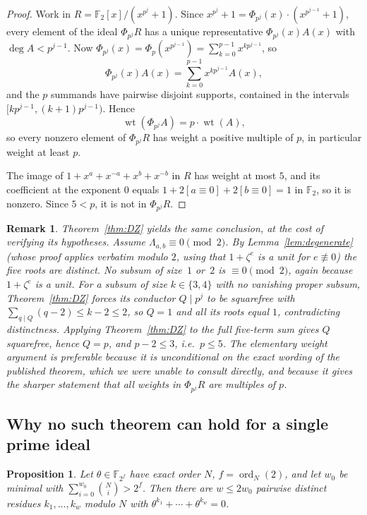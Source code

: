 \documentclass[a4paper]{article}
\newtheorem{proposition}[theorem]{Proposition}
\newtheorem{remark}[theorem]{Remark}
\newcommand{\F}{\mathbb{F}}
\newcommand{\ord}[2][]{\operatorname{ord}_{#1}\!\left(#2\right)}
\newcommand{\wt}{\operatorname{wt}}
\begin{document}
\begin{proof}
	Work in $R=\F_2[x]/(x^{p^j}+1)$.
	Since $x^{p^j}+1=\Phi_{p^j}(x)\cdot(x^{p^{j-1}}+1)$, every element of
	the ideal $\Phi_{p^j}R$ has a unique representative
	$\Phi_{p^j}(x)A(x)$ with $\deg A<p^{j-1}$.
	Now $\Phi_{p^j}(x)=\Phi_p(x^{p^{j-1}})=\sum_{k=0}^{p-1}x^{kp^{j-1}}$, so
	\[
		\Phi_{p^j}(x)A(x)=\sum_{k=0}^{p-1}x^{kp^{j-1}}A(x),
	\]
	and the $p$ summands have pairwise disjoint supports, contained in the
	intervals $[kp^{j-1},(k+1)p^{j-1})$.
	Hence
	\[
		\wt\!\left(\Phi_{p^j}A\right)=p\cdot\wt(A),
	\]
	so every nonzero element of $\Phi_{p^j}R$ has weight a positive
	multiple of $p$, in particular weight at least $p$.

	The image of $1+x^{a}+x^{-a}+x^{b}+x^{-b}$ in $R$ has weight at most
	$5$, and its coefficient at the exponent $0$ equals
	$1+2[a\equiv0]+2[b\equiv0]=1$ in $\F_2$, so it is nonzero.
	Since $5<p$, it is not in $\Phi_{p^j}R$.
\end{proof}

\begin{remark}
	Theorem~\ref{thm:DZ} yields the same conclusion, at the cost of
	verifying its hypotheses.
	Assume $\Lambda_{a,b}\equiv0\pmod{2}$.
	By Lemma~\ref{lem:degenerate} (whose proof applies verbatim modulo $2$,
	using that $1+\zeta^{e}$ is a unit for $e\not\equiv0$) the five roots
	are distinct.
	No subsum of size~$1$ or~$2$ is $\equiv0\pmod2$, again because
	$1+\zeta^{e}$ is a unit.
	For a subsum of size $k\in\{3,4\}$ with no vanishing proper subsum,
	Theorem~\ref{thm:DZ} forces its conductor $Q\mid p^j$ to be squarefree
	with $\sum_{q\mid Q}(q-2)\leq k-2\leq2$, so $Q=1$ and all its roots
	equal $1$, contradicting distinctness.
	Applying Theorem~\ref{thm:DZ} to the full five-term sum gives $Q$
	squarefree, hence $Q=p$, and $p-2\leq3$, i.e.\ $p\leq5$.
	The elementary weight argument is preferable because it is
	unconditional on the exact wording of the published theorem, which we
	were unable to consult directly, and because it gives the sharper
	statement that all weights in $\Phi_{p^j}R$ are multiples of $p$.
\end{remark}

\subsection{Why no such theorem can hold for a single prime ideal}

\begin{proposition}\label{prop:ubiquity}
	Let $\theta\in\F_{2^{f}}$ have exact order $N$, $f=\ord[N]{2}$, and let
	$w_0$ be minimal with $\sum_{i=0}^{w_0}\binom{N}{i}>2^{f}$.
	Then there are $w\leq2w_0$ pairwise distinct residues
	$k_1,\ldots,k_w$ modulo $N$ with
	$\theta^{k_1}+\cdots+\theta^{k_w}=0$.
\end{proposition}
\end{document}
